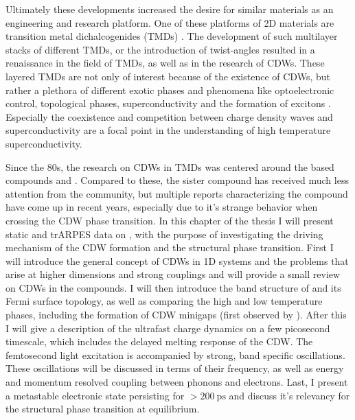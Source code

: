 Ultimately these developments increased the desire for similar materials as an engineering and research platform.
One of these platforms of 2D materials are transition metal dichalcogenides (TMDs) \cite{butler_progress_2013, chowdhury_progress_2020, liu_van_2016}.
The development of such multilayer stacks of different TMDs, or the introduction of twist-angles resulted in a renaissance in the field of TMDs, as well as in the research of CDWs.
These layered TMDs are not only of interest because of the existence of CDWs, but rather a plethora of different exotic phases and phenomena like optoelectronic control, topological phases, superconductivity and the formation of excitons \cite{jiang_interlayer_2021, schmitt_formation_2022, mak_photonics_2016, koppens_photodetectors_2014, manzeli_2d_2017}.
Especially the coexistence and competition between charge density waves and superconductivity are a focal point in the understanding of high temperature superconductivity.

Since the 80s, the research on CDWs in TMDs was centered around the  based compounds  and .
Compared to these, the sister compound  has received much less attention from the community, but multiple reports characterizing the compound have come up in recent years, especially due to it's strange behavior when crossing the CDW phase transition.
In this chapter of the thesis I will present static and trARPES data on , with the purpose of investigating the driving mechanism of the CDW formation and the structural phase transition.
First I will introduce the general concept of CDWs in 1D systems and the problems that arise at higher dimensions and strong couplings and will provide a small review on CDWs in the  compounds.
I will then introduce the band structure of  and its Fermi surface topology, as well as comparing the high and low temperature phases, including the formation of CDW minigaps (first observed by \cite{lin_evidence_2022}).
After this I will give a description of the ultrafast charge dynamics on a few picosecond timescale, which includes the delayed melting response of the CDW.
The femtosecond light excitation is accompanied by strong, band specific oscillations.
These oscillations will be discussed in terms of their frequency, as well as energy and momentum resolved coupling between phonons and electrons.
Last, I present a metastable electronic state persisting for $>\qty{200}{\pico\second}$ and discuss it's relevancy for the structural phase transition at equilibrium.

